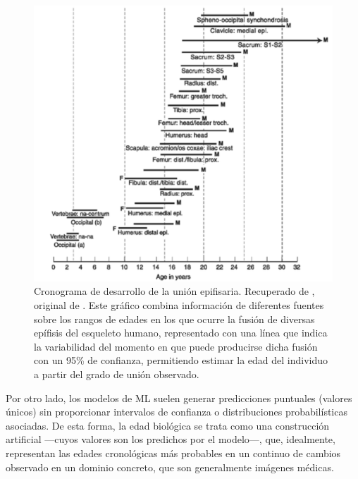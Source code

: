 \begin{figure}[h]
    \centering
    \includegraphics[width=\textwidth]{capitulos/cap_03/imagenes/range_values_epiphyselial.png}
    \caption[
        Cronograma de desarrollo de la unión epifisaria.
        Recuperado de \cite{byers2023}, original de \cite{buikstra1994}.
    ]{
        Cronograma de desarrollo de la unión epifisaria.
        Recuperado de \cite{byers2023}, original de \cite{buikstra1994}.
        Este gráfico combina información de diferentes fuentes sobre los rangos de edades en los que ocurre 
        la fusión de diversas epífisis del esqueleto humano, representado con una línea que indica la 
        variabilidad del momento en que puede producirse dicha fusión con un 95\% de confianza, permitiendo 
        estimar la edad del individuo a partir del grado de unión observado.
    }
    \label{fig:range_values_epiphyselial}
\end{figure}



Por otro lado, los modelos de ML suelen generar predicciones puntuales (valores únicos) sin proporcionar 
intervalos de confianza o distribuciones probabilísticas asociadas. 
De esta forma, la edad biológica se trata como una construcción artificial ---cuyos valores son los 
predichos por el modelo---, que, idealmente, representan las edades cronológicas más probables
en un continuo de cambios observado en un dominio concreto, que son generalmente imágenes médicas. 

